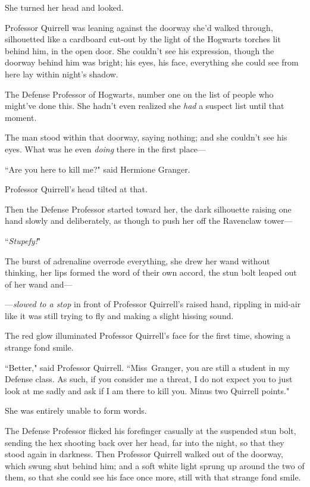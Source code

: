 She turned her head and looked.

Professor Quirrell was leaning against the doorway she'd walked through, silhouetted like a cardboard cut-out by the light of the Hogwarts torches lit behind him, in the open door. She couldn't see his expression, though the doorway behind him was bright; his eyes, his face, everything she could see from here lay within night's shadow.

The Defense Professor of Hogwarts, number one on the list of people who might've done this. She hadn't even realized she \emph{had} a suspect list until that moment.

The man stood within that doorway, saying nothing; and she couldn't see his eyes. What was he even \emph{doing} there in the first place—

``Are you here to kill me?" said Hermione Granger.

Professor Quirrell's head tilted at that.

Then the Defense Professor started toward her, the dark silhouette raising one hand slowly and deliberately, as though to push her off the Ravenclaw tower—

``\emph{Stupefy!}"

The burst of adrenaline overrode everything, she drew her wand without thinking, her lips formed the word of their own accord, the stun bolt leaped out of her wand and—

—\emph{slowed to a stop} in front of Professor Quirrell's raised hand, rippling in mid-air like it was still trying to fly and making a slight hissing sound.

The red glow illuminated Professor Quirrell's face for the first time, showing a strange fond smile.

``Better," said Professor Quirrell. ``Miss~Granger, you are still a student in my Defense class. As such, if you consider me a threat, I do not expect you to just look at me sadly and ask if I am there to kill you. Minus two Quirrell points."

She was entirely unable to form words.

The Defense Professor flicked his forefinger casually at the suspended stun bolt, sending the hex shooting back over her head, far into the night, so that they stood again in darkness. Then Professor Quirrell walked out of the doorway, which swung shut behind him; and a soft white light sprung up around the two of them, so that she could see his face once more, still with that strange fond smile.


